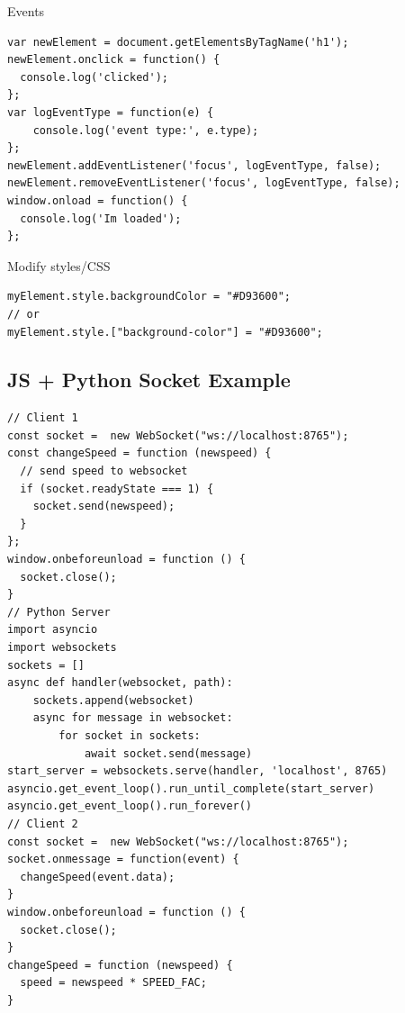 \documentclass[11pt]{article}
\begin{document}
Events
\lstset{breaklines=true,language=javascript,label= ,caption= ,captionpos=b,numbers=none}
\begin{lstlisting}
var newElement = document.getElementsByTagName('h1');
newElement.onclick = function() {
  console.log('clicked');
};
var logEventType = function(e) {
    console.log('event type:', e.type);
};
newElement.addEventListener('focus', logEventType, false);
newElement.removeEventListener('focus', logEventType, false);
window.onload = function() {
  console.log('Im loaded');
};
\end{lstlisting}
Modify styles/CSS
\lstset{breaklines=true,language=javascript,label= ,caption= ,captionpos=b,numbers=none}
\begin{lstlisting}
myElement.style.backgroundColor = "#D93600";
// or
myElement.style.["background-color"] = "#D93600";
\end{lstlisting}
\subsection{JS + Python Socket Example}
\label{sec:orgb106af4}
\lstset{breaklines=true,language=javascript,label= ,caption= ,captionpos=b,numbers=none}
\begin{lstlisting}
// Client 1
const socket =  new WebSocket("ws://localhost:8765");
const changeSpeed = function (newspeed) {
  // send speed to websocket 
  if (socket.readyState === 1) {
    socket.send(newspeed);
  }
};
window.onbeforeunload = function () {
  socket.close();
}
// Python Server
import asyncio
import websockets
sockets = []
async def handler(websocket, path):
    sockets.append(websocket)
    async for message in websocket:
        for socket in sockets:
            await socket.send(message)
start_server = websockets.serve(handler, 'localhost', 8765)
asyncio.get_event_loop().run_until_complete(start_server)
asyncio.get_event_loop().run_forever()
// Client 2
const socket =  new WebSocket("ws://localhost:8765");
socket.onmessage = function(event) {
  changeSpeed(event.data);
}
window.onbeforeunload = function () {
  socket.close();
}
changeSpeed = function (newspeed) {
  speed = newspeed * SPEED_FAC;
}
\end{lstlisting}
\end{document}
